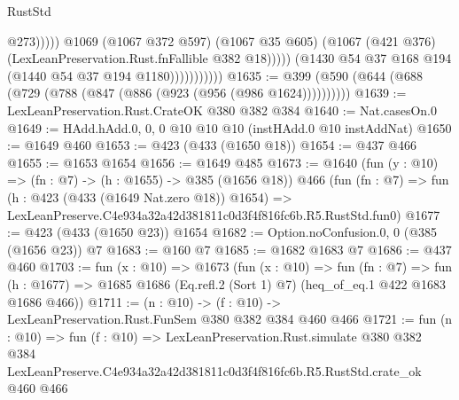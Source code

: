 \begin{lexlean}{RustStd}
\begin{coremodule}
                                      @273)))))
                            @1069
                            (@1067 @372 @597)
                            (@1067 @35 @605)
                            (@1067 (@421 @376) (LexLeanPreservation.Rust.fnFallible @382 @18)))))
                      (@1430 @54 @37 @168 @194 (@1440 @54 @37 @194 @1180)))))))))))
@1635 := @399 (@590 (@644 (@688 (@729 (@788 (@847 (@886 (@923 (@956 (@986 @1624))))))))))
@1639 := LexLeanPreservation.Rust.CrateOK @380 @382 @384
@1640 := Nat.casesOn.{0}
@1649 := HAdd.hAdd.{0, 0, 0} @10 @10 @10 (instHAdd.{0} @10 instAddNat)
@1650 := @1649 @460
@1653 := @423 (@433 (@1650 @18))
@1654 := @437 @466
@1655 := @1653 @1654
@1656 := @1649 @485
@1673 := @1640
    (fun (y : @10) => (fn : @7) -> (h : @1655) -> @385 (@1656 @18))
    @466
    (fun (fn : @7) =>
    fun (h : @423 (@433 (@1649 Nat.zero @18)) @1654) =>
    LexLeanPreserve.C4e934a32a42d381811c0d3f4f816fc6b.R5.RustStd.fun0)
@1677 := @423 (@433 (@1650 @23)) @1654
@1682 := Option.noConfusion.{0, 0} (@385 (@1656 @23)) @7
@1683 := @160 @7
@1685 := @1682 @1683 @7
@1686 := @437 @460
@1703 := fun (x : @10) =>
  @1673
    (fun (x : @10) =>
    fun (fn : @7) =>
    fun (h : @1677) => @1685 @1686 (Eq.refl.{2} (Sort 1) @7) (heq_of_eq.{1} @422 @1683 @1686 @466))
@1711 := (n : @10) -> (f : @10) -> LexLeanPreservation.Rust.FunSem @380 @382 @384 @460 @466
@1721 := fun (n : @10) =>
  fun (f : @10) =>
  LexLeanPreservation.Rust.simulate
    @380
    @382
    @384
    LexLeanPreserve.C4e934a32a42d381811c0d3f4f816fc6b.R5.RustStd.crate_ok
    @460
    @466
\end{coremodule}
\end{lexlean}

